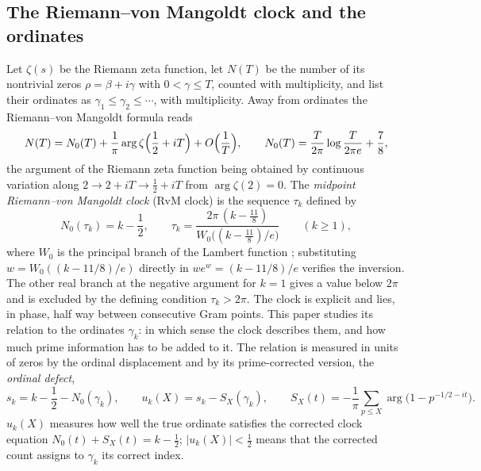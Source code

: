 \documentclass[preprint,12pt]{elsarticle}
\numberwithin{equation}{section}
\theoremstyle{plain}
\theoremstyle{definition}
\theoremstyle{remark}
\newcommand{\NO}{N_0}
\begin{document}
\subsection{The Riemann--von Mangoldt clock and the ordinates}
\label{subsec:clock_intro}
Let $\zeta(s)$ be the Riemann zeta function, let $N(T)$ be the number of its nontrivial zeros $\rho=\beta+i\gamma$ with $0<\gamma\le T$, counted with multiplicity, and list their ordinates as $\gamma_1\le\gamma_2\le\cdots$, with multiplicity. Away from ordinates the Riemann--von Mangoldt formula reads \cite[\S\S9.3--9.4]{Titchmarsh1986}
\begin{equation}
 N(T)=\NO(T)+\frac1\pi\arg\zeta\Bigl(\frac12+iT\Bigr)+O\Bigl(\frac1T\Bigr),\qquad \NO(T)=\frac{T}{2\pi}\log\frac{T}{2\pi e}+\frac78,
 \label{eq:intro_rvm}
\end{equation}
the argument of the Riemann zeta function being obtained by continuous variation along $2\to2+iT\to\frac12+iT$ from $\arg\zeta(2)=0$. The \emph{midpoint Riemann--von Mangoldt clock} (RvM clock) is the sequence $\tau_k$ defined by
\begin{equation}
 \NO(\tau_k)=k-\frac12,\qquad \tau_k=\frac{2\pi\,(k-\frac{11}8)}{W_0\bigl((k-\frac{11}8)/e\bigr)}\qquad(k\ge1),
 \label{eq:intro_clock}
\end{equation}
where $W_0$ is the principal branch of the Lambert function \cite{Corless1996}; substituting $w=W_0((k-11/8)/e)$ directly in $we^w=(k-11/8)/e$ verifies the inversion. The other real branch at the negative argument for $k=1$ gives a value below $2\pi$ and is excluded by the defining condition $\tau_k>2\pi$. The clock is explicit and lies, in phase, half way between consecutive Gram points. This paper studies its relation to the ordinates $\gamma_k$: in which sense the clock describes them, and how much prime information has to be added to it. The relation is measured in units of zeros by the ordinal displacement and by its prime-corrected version, the \emph{ordinal defect},
\begin{equation}
 s_k=k-\frac12-\NO(\gamma_k),\qquad u_k(X)=s_k-S_X(\gamma_k),\qquad S_X(t)=-\frac1\pi\sum_{p\le X}\arg\bigl(1-p^{-1/2-it}\bigr).
 \label{eq:intro_defect}
\end{equation}
$u_k(X)$ measures how well the true ordinate satisfies the corrected clock equation $\NO(t)+S_X(t)=k-\frac12$; $|u_k(X)|<\frac12$ means that the corrected count assigns to $\gamma_k$ its correct index.
\end{document}
